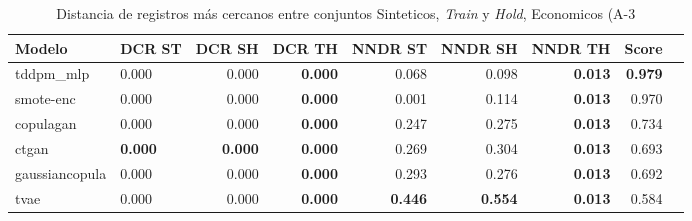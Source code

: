 \begin{table}[H]
\centering
\caption{Distancia de registros más cercanos entre conjuntos Sinteticos, \emph{Train} y \emph{Hold}, Economicos (A-3}
\label{table-dcr-economicos-a-3}
\begin{tabular}{|l|l|r|r|r|r|r|r|r|}
\hline
\rowcolor[gray]{0.8}
Modelo & DCR ST & DCR SH & DCR TH & NNDR ST & NNDR SH & NNDR TH & \textbf{Score} \\
\hline tddpm\_mlp & 0.000 & \cellcolor[rgb]{0.9, 0.54, 0.52} 0.000 & \bfseries 0.000 & 0.068 & 0.098 & \bfseries 0.013 & \bfseries 0.979 \\
\hline smote-enc & \cellcolor[rgb]{0.9, 0.54, 0.52} 0.000 & 0.000 & \bfseries 0.000 & 0.001 & 0.114 & \bfseries 0.013 & 0.970 \\
\hline copulagan & 0.000 & 0.000 & \bfseries 0.000 & 0.247 & 0.275 & \bfseries 0.013 & 0.734 \\
\hline ctgan & \bfseries 0.000 & \bfseries 0.000 & \bfseries 0.000 & 0.269 & 0.304 & \bfseries 0.013 & 0.693 \\
\hline gaussiancopula & 0.000 & 0.000 & \bfseries 0.000 & 0.293 & 0.276 & \bfseries 0.013 & 0.692 \\
\hline tvae & 0.000 & 0.000 & \bfseries 0.000 & \bfseries 0.446 & \bfseries 0.554 & \bfseries 0.013 & 0.584 \\
\hline
\end{tabular}
\end{table}
